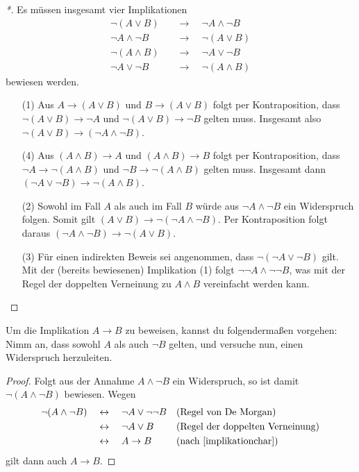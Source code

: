 \begin{proof}[*]
    Es müssen insgesamt vier Implikationen
    \begin{align}
    \neg (A\lor B) \quad& \to\quad \neg A\land \neg B \tag{1}\\
    \neg A\land \neg B\quad& \to\quad  \neg (A\lor B) \tag{2}\\
    \neg(A\land B) \quad& \to \quad \neg A\lor \neg B \tag{3}\\
    \neg A\lor \neg B \quad& \to \quad \neg(A\land B) \tag{4}
    \end{align}
    bewiesen werden.
    \begin{enumerate}
        \item[(1)] Aus $A\to (A\lor B)$ und $B\to (A\lor B)$ folgt per Kontraposition, dass $\neg (A\lor B)\to \neg A$ und $\neg(A\lor B) \to \neg B$ gelten muss. Insgesamt also $\neg(A\lor B)\to( \neg A\land\neg B)$.
        \item[(4)] Aus $(A\land B)\to A$ und $(A\land B) \to B$ folgt per Kontraposition, dass $\neg A\to \neg(A\land B)$ und $\neg B\to \neg(A\land B)$ gelten muss. Insgesamt dann $(\neg A\lor \neg B)\to \neg(A\land B)$.
        \item[(2)] Sowohl im Fall $A$ als auch im Fall $B$ würde aus $\neg A\land \neg B$ ein Widerspruch folgen. Somit gilt $(A\lor B)\to \neg (\neg A\land \neg B)$. Per Kontraposition folgt daraus $(\neg A\land \neg B) \to \neg(A\lor B)$.
        \item[(3)] Für einen indirekten Beweis sei angenommen, dass $\neg (\neg A\lor\neg B)$ gilt. Mit der (bereits bewiesenen) Implikation (1) folgt $\neg\neg A\land\neg\neg B$, was mit der Regel der doppelten Verneinung zu $A\land B$ vereinfacht werden kann. \qedhere
    \end{enumerate}
\end{proof}

 
\begin{satz}
    Um die Implikation $A\to B$ zu beweisen, kannst du folgendermaßen vorgehen: Nimm an, dass sowohl $A$ als auch $\neg B$ gelten, und versuche nun, einen Widerspruch herzuleiten.
\end{satz}
\begin{proof}
    Folgt aus der Annahme $A\land \neg B$ ein Widerspruch, so ist damit $\neg(A\land \neg B)$ bewiesen. Wegen
    \begin{align*}
        \neg (A\land \neg B) \quad&\leftrightarrow\quad \neg A\lor \neg\neg B && (\text{Regel von De Morgan}) \\
        &\leftrightarrow\quad \neg A\lor B && (\text{Regel der doppelten Verneinung}) \\
        & \leftrightarrow\quad A\to B && (\text{nach \cref{implikationchar}})
    \end{align*}
    gilt dann auch $A\to B$.
\end{proof}


